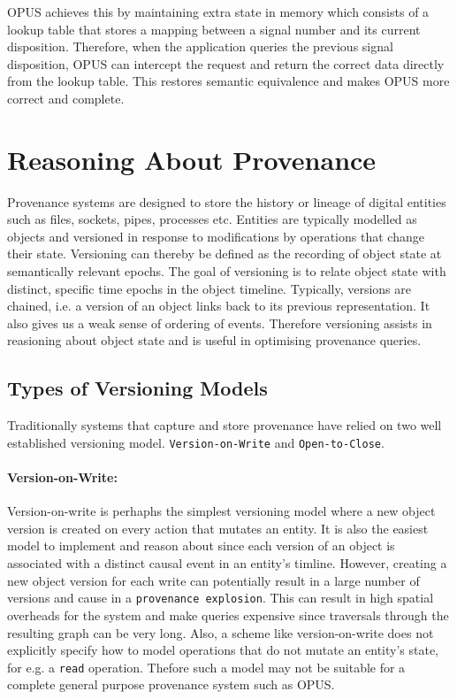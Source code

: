 \documentclass[withindex,glossary]{cam-thesis}
\begin{document}
OPUS achieves this by maintaining extra state in memory which consists of a lookup table that stores a mapping between a signal number and its current disposition.
Therefore, when the application queries the previous signal disposition, OPUS can intercept the request and return the correct data directly from the lookup table.
This restores semantic equivalence and makes OPUS more correct and complete.

\section{Reasoning About Provenance}
Provenance systems are designed to store the history or lineage of digital entities such as files, sockets, pipes, processes etc.
Entities are typically modelled as objects and versioned in response to modifications by operations that change their state.
Versioning can thereby be defined as the recording of object state at semantically relevant epochs.
The goal of versioning is to relate object state with distinct, specific time epochs in the object timeline.
Typically, versions are chained, i.e. a version of an object links back to its previous representation.
It also gives us a weak sense of ordering of events.
Therefore versioning assists in reasioning about object state and is useful in optimising provenance queries.

\subsection{Types of Versioning Models}
Traditionally systems that capture and store provenance have relied on two well established versioning model.
\texttt{Version-on-Write} and \texttt{Open-to-Close}.

\paragraph{Version-on-Write:}
Version-on-write is perhaphs the simplest versioning model where a new object version is created on every action that mutates an entity.
It is also the easiest model to implement and reason about since each version of an object is associated with a distinct causal event in an entity's timline.
However, creating a new object version for each write can potentially result in a large number of versions and cause in a \texttt{provenance explosion}.
This can result in high spatial overheads for the system and make queries expensive since traversals through the resulting graph can be very long.
Also, a scheme like version-on-write does not explicitly specify how to model operations that do not mutate an entity's state, for e.g. a \texttt{read} operation.
Thefore such a model may not be suitable for a complete general purpose provenance system such as OPUS.
\end{document}
